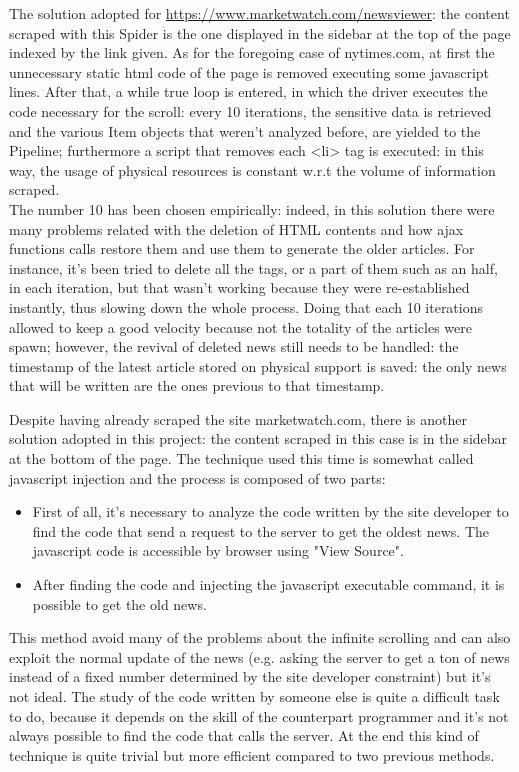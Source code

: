 \par 
The solution adopted for \url{https://www.marketwatch.com/newsviewer}: the content scraped with this Spider is the one displayed in the sidebar at the top of the page indexed by the link given. As for the foregoing case of nytimes.com, at first the unnecessary static html code of the page is removed executing some javascript lines. After that, a while true loop is entered, in which the driver executes the code necessary for the scroll: every 10 iterations, the sensitive data is retrieved and the various Item objects that weren't analyzed before, are yielded to the Pipeline; furthermore a script that removes each <li> tag is executed: in this way, the usage of physical resources is constant w.r.t the volume of information scraped. \\
The number 10 has been chosen empirically: indeed, in this solution there were many problems related with the deletion of HTML contents and how ajax functions calls restore them and use them to generate the older articles. For instance, it's been tried to delete all the tags, or a part of them such as an half, in each iteration, but that wasn't working because they were re-established instantly, thus slowing down the whole process. Doing that each 10 iterations allowed to keep a good velocity because not the totality of the articles were spawn; however, the revival of deleted news still needs to be handled: the timestamp of the latest article stored on physical support is saved: the only news that will be written are the ones previous to that timestamp.
\par 
Despite having already scraped the site marketwatch.com, there is another solution adopted in this project: the content scraped in this case is in the sidebar at the bottom of the page. The technique used this time is somewhat called javascript injection and the process is composed of two parts:
\begin{itemize}
	\item First of all, it's necessary to analyze the code written by the site developer to find the code that send a request to the server to get the oldest news. The javascript code is accessible by browser using "View Source".
	\item After finding the code and injecting the javascript executable command, it is possible to get the old news.
\end{itemize}
This method avoid many of the problems about the infinite scrolling and can also exploit the normal update of the news (e.g. asking the server to get a ton of news instead of a fixed number determined by the site developer constraint) but it's not ideal. The study of the code written by someone else is quite a difficult task to do, because it depends on the skill of the counterpart programmer and it's not always possible to find the code that calls the server. At the end this kind of technique is quite trivial but more efficient compared to two previous methods.
\par
